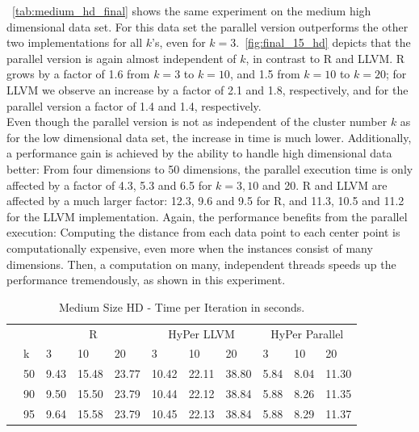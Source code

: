 ~\autoref{tab:medium_hd_final} shows the same experiment on the medium high dimensional data set. For this data set the parallel version outperforms the other two implementations for all $k$'s, even for $k = 3$.~\autoref{fig:final_15_hd} depicts that the parallel version is again almost independent of $k$, in contrast to R and LLVM. R grows by a factor of 1.6 from $k = 3$ to $k = 10$, and 1.5 from $k = 10$ to $k = 20$; for LLVM we observe an increase by a factor of 2.1 and 1.8, respectively, and for the parallel version a factor of 1.4 and 1.4, respectively. 
\\
Even though the parallel version is not as independent of the cluster number $k$ as for the low dimensional data set, the increase in time is much lower. Additionally, a performance gain is achieved by the ability to handle high dimensional data better: From four dimensions to 50 dimensions, the parallel execution time is only affected by a factor of 4.3, 5.3 and 6.5 for $k = 3, 10$ and 20. R and LLVM are affected by a much larger factor: 12.3, 9.6 and 9.5 for R, and 11.3, 10.5 and 11.2 for the LLVM implementation. Again, the performance benefits from the parallel execution: Computing the distance from each data point to each center point is computationally expensive, even more when the instances consist of many dimensions. Then, a computation on many, independent threads speeds up the performance tremendously, as shown in this experiment. 


\begin{table}[htsb]
  \caption[Medium Size HD - Time per Iteration]{Medium Size HD - Time per Iteration in seconds.}
  \label{tab:medium_hd_final}
  \centering
  \begin{tabular}{l l l ll |l l l |l l l }
    \toprule
      && \multicolumn{3}{c}{R} & \multicolumn{3}{c}{HyPer LLVM} & \multicolumn{3}{c}{HyPer Parallel}  \\
      &k & 3 & 10 & 20 & 3 & 10 & 20 & 3 & 10 & 20 \\
    \midrule
      \parbox[t]{2mm}{} &50  & 9.43 & 15.48 & 23.77 & 10.42 & 22.11 & 38.80 & 5.84 & 8.04 & 11.30 \\
      &90  & 9.50 & 15.50 & 23.79 & 10.44 & 22.12 & 38.84 & 5.88 & 8.26 & 11.35 \\
      &95  & 9.64 & 15.58 & 23.79 & 10.45 & 22.13 & 38.84 & 5.88 & 8.29 & 11.37 \\
    \bottomrule
  \end{tabular}
\end{table}



